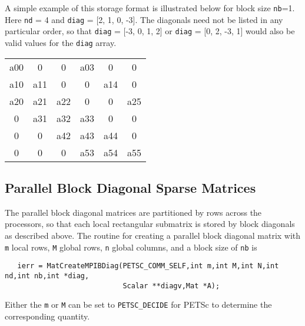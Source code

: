A simple example of this storage format is illustrated below for block
size {\tt nb}=1. 
Here {\tt nd} = 4 and {\tt diag} = [2, 1, 0, -3]. The
diagonals need not be listed in any particular order, so that
{\tt diag} = [-3, 0, 1, 2] or {\tt diag} = [0, 2, -3, 1] would also
be valid values for the {\tt diag} array. 

\begin{center}
\begin{tabular}{| c c c c c c |}
\hline
a00  &0    &0    &a03  &0    &0\\
a10  &a11  &0    &0    &a14  &0\\
a20  &a21  &a22  &0    &0    &a25\\
0    &a31  &a32  &a33  &0    &0\\
0    &0    &a42  &a43  &a44  &0\\
0    &0    &0    &a53  &a54  &a55\\
\hline
\end{tabular}
\end{center}

\subsection{Parallel Block Diagonal Sparse Matrices}

The parallel block diagonal matrices are partitioned by rows across
the processors, so that each local rectangular submatrix is stored by
block diagonals as described above.  The routine for creating a
parallel block diagonal matrix with {\tt m} local rows, {\tt M} global
rows, {\tt n} global columns, and a block size of {\tt nb} is
\begin{verbatim}
   ierr = MatCreateMPIBDiag(PETSC_COMM_SELF,int m,int M,int N,int nd,int nb,int *diag,
                            Scalar **diagv,Mat *A);
\end{verbatim}
Either the {\tt m} or {\tt M} can be set to {\tt PETSC\_DECIDE} for PETSc
to determine the corresponding quantity.





